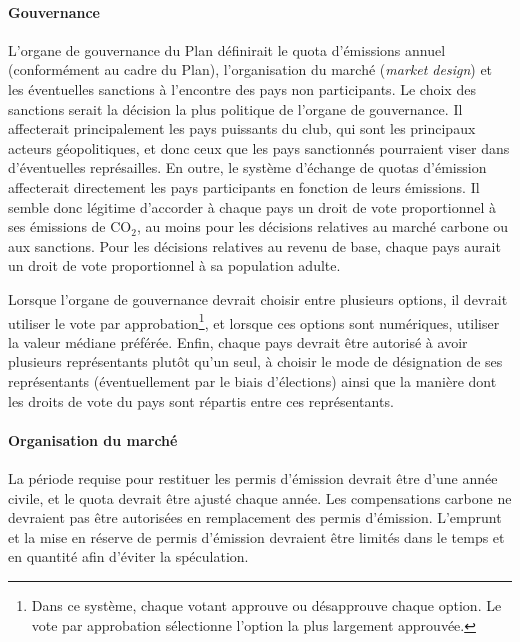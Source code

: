 \documentclass[a5paper,french]{memoir}
\begin{document}
\paragraph{Gouvernance} 
L'organe de gouvernance du Plan définirait le quota d'émissions annuel (conformément au cadre du Plan), l'organisation du marché (\textit{market design}) et les éventuelles sanctions à l'encontre des pays non participants. Le choix des sanctions serait la décision la plus politique de l'organe de gouvernance. Il affecterait principalement les pays puissants du club, qui sont les principaux acteurs géopolitiques, et donc ceux que les pays sanctionnés pourraient viser dans d'éventuelles représailles. En outre, le système d'échange de quotas d'émission affecterait directement les pays participants en fonction de leurs émissions. Il semble donc légitime d'accorder à chaque pays un droit de vote proportionnel à ses émissions de CO$_\text{2}$, au moins pour les décisions relatives au marché carbone ou aux sanctions. Pour les décisions relatives au revenu de base, chaque pays aurait un droit de vote proportionnel à sa population adulte. 

Lorsque l'organe de gouvernance devrait choisir entre plusieurs options, il devrait utiliser le vote par approbation\footnote{Dans ce système, chaque votant approuve ou désapprouve chaque option. Le vote par approbation sélectionne l'option la plus largement approuvée.}, et lorsque ces options sont numériques, utiliser la valeur médiane préférée. Enfin, chaque pays devrait être autorisé à avoir plusieurs représentants plutôt qu'un seul, à choisir le mode de désignation de ses représentants (éventuellement par le biais d'élections) ainsi que la manière dont les droits de vote du pays sont répartis entre ces représentants. 


\paragraph{Organisation du marché} 
La période requise pour restituer les permis d'émission devrait être d'une année civile, et le quota devrait être ajusté chaque année. Les compensations carbone ne devraient pas être autorisées en remplacement des permis d'émission. L'emprunt et la mise en réserve de permis d'émission devraient être limités dans le temps et en quantité afin d'éviter la spéculation. %
\end{document}
